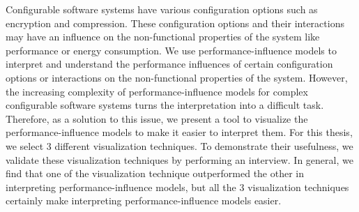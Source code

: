 
Configurable software systems have various configuration options such as encryption and compression. These configuration options and their interactions may have an influence on the non-functional properties of the system like performance or energy consumption. We use performance-influence models to interpret and understand the performance influences of certain configuration options or interactions on the non-functional properties of the system. However, the increasing complexity of performance-influence models for complex configurable software systems turns the interpretation into a difficult task. Therefore, as a solution to this issue, we present a tool to visualize the performance-influence models to make it easier to interpret them. For this thesis, we select 3 different visualization techniques. To demonstrate their usefulness, we validate these visualization techniques by performing an interview. In general, we find that one of the visualization technique outperformed the other in interpreting performance-influence models, but all the 3 visualization techniques certainly make interpreting performance-influence models easier.